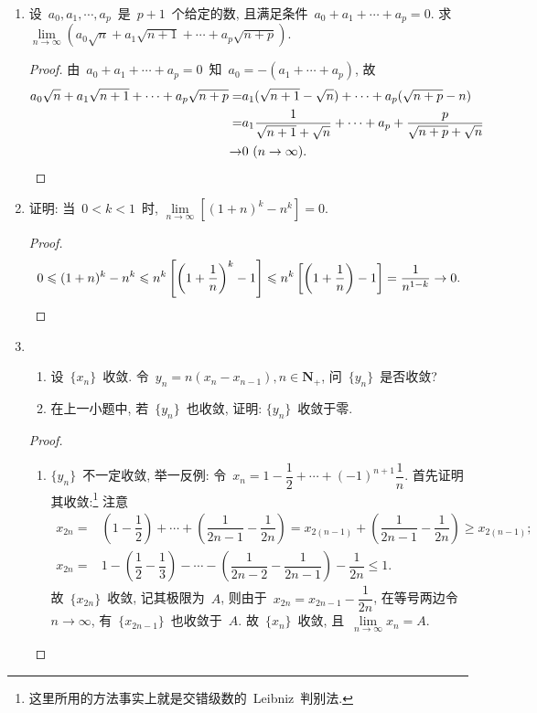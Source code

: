\documentclass[UTF8,a4paper,11pt,twoside]{book}
\begin{document}
\begin{enumerate}
	\item 设~$a_0, a_1, \cdots ,a_p$~是~$p+1$~个给定的数, 且满足条件~$a_0+a_1+\cdots+a_p=0$. 求~$\lim\limits_{n\to\infty} (a_0\sqrt{n}+a_1\sqrt{n+1}+\cdots+a_p\sqrt{n+p})$.
	      \begin{proof}
		      由~$a_0+a_1+\cdots+a_p=0$~知~$a_0=-(a_1+\cdots+a_p)$, 故
		      \[
			      \begin{split}
				      a_0\sqrt{n}+a_1\sqrt{n+1}+\cdots+a_p\sqrt{n+p}=&a_1(\sqrt{n+1}-\sqrt{n})+\cdots+a_p(\sqrt{n+p}-{n})\\
				      =&a_1\dfrac{1}{\sqrt{n+1}+\sqrt{n}}+\cdots+a_p+\dfrac{p}{\sqrt{n+p}+\sqrt{n}}\\
				      \to&0 \ (n\to\infty). \qedhere
			      \end{split}
		      \]
	      \end{proof}

	\item 证明: 当~$0<k<1$~时, $\lim\limits_{n\to\infty} [(1+n)^k-n^k]=0$.
	      \begin{proof}
		      \[
			      0\leqslant(1+n)^k-n^k\leqslant n^k\left[\left(1+\dfrac{1}{n}\right)^k-1\right]\leqslant n^k\left[\left(1+\dfrac{1}{n}\right)-1\right]=\dfrac{1}{n^{1-k}}\to 0. \qedhere
		      \]
	      \end{proof}

	\item
	      \begin{enumerate}[(1)]
		      \item 设~$\{x_n\}$~收敛. 令~$y_n=n(x_n-x_{n-1}), n\in\mathbf{N}_{+}$, 问~$\{y_n\}$~是否收敛?
		      \item 在上一小题中, 若~$\{y_n\}$~也收敛, 证明: $\{y_n\}$~收敛于零.
	      \end{enumerate}
	      \begin{proof}
		      \begin{enumerate}[(1)]
			      \item $\{y_n\}$~不一定收敛, 举一反例: 令~$x_n=1-\dfrac{1}{2}+\cdots+(-1)^{n+1}\dfrac{1}{n}$. 首先证明其收敛:\footnote{这里所用的方法事实上就是交错级数的~Leibniz~判别法.} 注意
			            \[
				            \begin{split}
					            x_{2n}=&\left(1-\dfrac{1}{2}\right)+\cdots+\left(\dfrac{1}{2n-1}-\dfrac{1}{2n}\right)=x_{2(n-1)}+\left(\dfrac{1}{2n-1}-\dfrac{1}{2n}\right)\geqslant x_{2(n-1)};\\
					            x_{2n}=&1-\left(\dfrac{1}{2}-\dfrac{1}{3}\right)-\cdots-\left(\dfrac{1}{2n-2}-\dfrac{1}{2n-1}\right)-\dfrac{1}{2n}\leqslant 1.
				            \end{split}
			            \]
			            故~$\{x_{2n}\}$~收敛, 记其极限为~$A$, 则由于~$x_{2n}=x_{2n-1}-\dfrac{1}{2n}$, 在等号两边令~$n\to\infty$, 有~$\{x_{2n-1}\}$~也收敛于~$A$. 故~$\{x_n\}$~收敛, 且~$\lim\limits_{n\to\infty} x_n=A$.


\end{enumerate}
\end{proof}
\end{enumerate}
\end{document}
